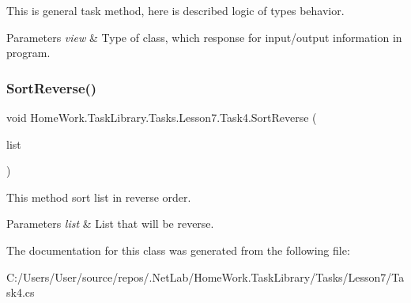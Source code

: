 This is general task method, here is described logic of types behavior. 


\begin{DoxyParams}{Parameters}
{\em view} & Type of class, which response for input/output information in program.\\
\hline
\end{DoxyParams}
\mbox{\label{class_home_work_1_1_task_library_1_1_tasks_1_1_lesson7_1_1_task4_abd6629495c092b9558a056c14dc268f4}} 
\subsubsection{\texorpdfstring{SortReverse()}{SortReverse()}}
{\footnotesize\ttfamily void Home\+Work.\+Task\+Library.\+Tasks.\+Lesson7.\+Task4.\+Sort\+Reverse (\begin{DoxyParamCaption}\item[{ref List$<$ string $>$}]{list }\end{DoxyParamCaption})\hspace{0.3cm}{\ttfamily [private]}}



This method sort list in reverse order. 


\begin{DoxyParams}{Parameters}
{\em list} & List that will be reverse.\\
\hline
\end{DoxyParams}


The documentation for this class was generated from the following file\+:\begin{DoxyCompactItemize}
\item 
C\+:/\+Users/\+User/source/repos/.\+Net\+Lab/\+Home\+Work.\+Task\+Library/\+Tasks/\+Lesson7/Task4.\+cs\end{DoxyCompactItemize}

